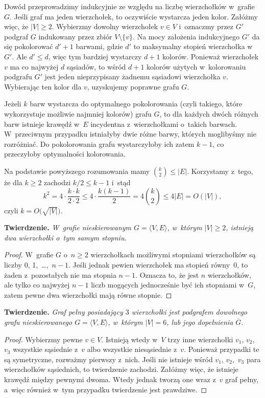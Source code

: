\subproblem %
Dowód przeprowadzimy indukcyjnie ze względu na liczbę wierzchołków w~grafie $G$.
Jeśli graf ma jeden wierzchołek, to oczywiście wystarcza jeden kolor.
Załóżmy więc, że $|V|\ge2$.
Wybierzmy dowolny wierzchołek $v\in V$ i~oznaczmy przez $G'$ podgraf $G$ indukowany przez zbiór $V\setminus\{v\}$.
Na mocy założenia indukcyjnego $G'$ da się pokolorować $d'+1$ barwami, gdzie $d'$ to maksymalny stopień wierzchołka w~$G'$.
Ale $d'\le d$, więc tym bardziej wystarczy $d+1$ kolorów.
Ponieważ wierzchołek $v$ ma co najwyżej $d$ sąsiadów, to wśród $d+1$ kolorów użytych w~kolorowaniu podgrafu $G'$ jest jeden nieprzypisany żadnemu sąsiadowi wierzchołka $v$.
Wybierając ten kolor dla $v$, uzyskujemy poprawne  grafu $G$.

\subproblem %
Jeżeli $k$ barw wystarcza do optymalnego pokolorowania (czyli takiego, które wykorzystuje możliwie najmniej kolorów) grafu $G$, to dla każdych dwóch różnych barw istnieje krawędź w~$E$ incydentna z~wierzchołkami o~takich barwach.
W~przeciwnym przypadku istniałyby dwie różne barwy, których moglibyśmy nie rozróżniać.
Do pokolorowania grafu wystarczyłoby ich zatem $k-1$, co przeczyłoby optymalności kolorowania.

Na podstawie powyższego rozumowania mamy $\binom{k}{2}\le|E|$.
Korzystamy z~tego, że dla $k\ge2$ zachodzi $k/2\le k-1$ i~stąd
\[
    k^2 = 4\cdot\frac{k\cdot k}{2\cdot2} \le 4\cdot\frac{k(k-1)}{2} = 4\binom{k}{2} \le 4|E| = O(|V|),
\]
czyli $k=O\bigl(\!\sqrt{|V|}\bigr)$.


\subproblem %
\textsf{\textbf{Twierdzenie.}} \textit{W~grafie nieskierowanym\/ $G=\langle V,E\rangle$, w~którym\/ $|V|\ge2$, istnieją dwa wierzchołki o~tym samym stopniu.}
\begin{proof}
W~grafie $G$ o~$n\ge2$ wierzchołkach możliwymi stopniami wierzchołków są liczby 0, 1,~\dots,~$n-1$.
Jeśli jednak pewien wierzchołek ma stopień równy~0, to żaden z~pozostałych nie ma stopnia $n-1$.
Oznacza to, że jest $n$ wierzchołków, ale tylko co najwyżej $n-1$ liczb mogących jednocześnie być ich stopniami w~$G$, zatem pewne dwa wierzchołki mają równe stopnie.
\end{proof}

\subproblem %
\textsf{\textbf{Twierdzenie.}} \textit{Graf pełny posiadający\/ $3$ wierzchołki jest podgrafem dowolnego grafu nieskierowanego\/ $G=\langle V,E\rangle$, w~którym\/ $|V|=6$, lub jego dopełnienia\/ $\overline{G}$.}
\begin{proof}
Wybierzmy pewne $v\in V$.
Istnieją wtedy w~$V$ trzy inne wierzchołki $v_1$, $v_2$,~$v_3$ wszystkie sąsiednie z~$v$ albo wszystkie niesąsiednie z~$v$.
Ponieważ przypadki te są symetryczne, rozważmy pierwszy z~nich.
Jeśli nie istnieje wśród $v_1$, $v_2$,~$v_3$ para wierzchołków sąsiednich, to twierdzenie zachodzi.
Załóżmy więc, że istnieje krawędź między pewnymi dwoma.
Wtedy jednak tworzą one wraz z~$v$ graf pełny, a~więc również w~tym przypadku twierdzenie jest prawdziwe.
\end{proof}


